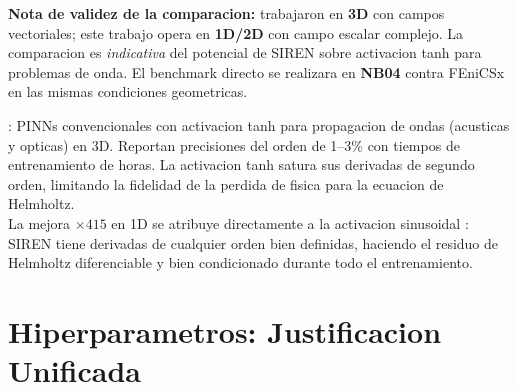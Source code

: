 \documentclass[12pt,a4paper]{article}
\begin{document}
\begin{warnbox}
\textbf{Nota de validez de la comparacion:} \textcite{schoder2024} trabajaron en
\textbf{3D} con campos vectoriales; este trabajo opera en \textbf{1D/2D} con campo
escalar complejo. La comparacion es \emph{indicativa} del potencial de SIREN
sobre activacion tanh para problemas de onda. El benchmark directo se realizara en
\textbf{NB04} contra FEniCSx en las mismas condiciones geometricas.
\end{warnbox}

\begin{litbox}
\textbf{\textcite{schoder2024}}: PINNs convencionales con activacion tanh para
propagacion de ondas (acusticas y opticas) en 3D. Reportan precisiones del orden
de 1--3\% con tiempos de entrenamiento de horas. La activacion tanh satura sus
derivadas de segundo orden, limitando la fidelidad de la perdida de fisica para
la ecuacion de Helmholtz.\\[4pt]
La mejora $\times415$ en 1D se atribuye directamente a la activacion sinusoidal
\parencite{sitzmann2020}: SIREN tiene derivadas de cualquier orden bien definidas,
haciendo el residuo de Helmholtz diferenciable y bien condicionado durante todo
el entrenamiento.
\end{litbox}

\section{Hiperparametros: Justificacion Unificada}
\end{document}
